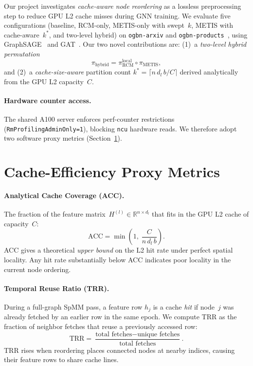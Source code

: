 \documentclass[sigconf,review]{acmart}
\begin{document}
Our project investigates \emph{cache-aware node reordering} as a lossless
preprocessing step to reduce GPU L2 cache misses during GNN training.
We evaluate five configurations (baseline, RCM-only, METIS-only with swept~$k$,
METIS with cache-aware~$k^*$, and two-level hybrid) on
\texttt{ogbn-arxiv} and \texttt{ogbn-products}~\cite{hu2020ogb},
using GraphSAGE~\cite{hamilton2017sage} and GAT~\cite{velickovic2018gat}.
Our two novel contributions are:
(1)~a \emph{two-level hybrid permutation}
\[
  \pi_{\text{hybrid}} = \pi^{\text{local}}_{\text{RCM}} \circ \pi_{\text{METIS}},
\]
and (2)~a \emph{cache-size-aware} partition count
$k^* = \lceil n\,d_l\,b / C \rceil$ derived analytically from the
GPU L2 capacity~$C$.

\paragraph{Hardware counter access.}
The shared A100 server enforces perf-counter restrictions
(\texttt{RmProfilingAdminOnly=1}), blocking \texttt{ncu} hardware reads.
We therefore adopt two software proxy metrics (Section~\ref{sec:proxies}).

\section{Cache-Efficiency Proxy Metrics}
\label{sec:proxies}

\paragraph{Analytical Cache Coverage (ACC).}
The fraction of the feature matrix~$H^{(l)}\!\in\!\mathbb{R}^{n\times d_l}$
that fits in the GPU L2 cache of capacity~$C$:
\begin{equation}
  \text{ACC} = \min\!\left(1,\; \frac{C}{n\,d_l\,b}\right).
\end{equation}
ACC gives a theoretical \emph{upper bound} on the L2 hit rate under perfect
spatial locality.  Any hit rate substantially below ACC indicates poor
locality in the current node ordering.

\paragraph{Temporal Reuse Ratio (TRR).}
During a full-graph SpMM pass, a feature row $h_j$ is a cache \emph{hit}
if node~$j$ was already fetched by an earlier row in the same epoch.
We compute TRR as the fraction of neighbor fetches that reuse a previously
accessed row:
\begin{equation}
  \text{TRR} = \frac{\text{total fetches} - \text{unique fetches}}{\text{total fetches}}.
\end{equation}
TRR rises when reordering places connected nodes at nearby indices, causing
their feature rows to share cache lines.
\end{document}
